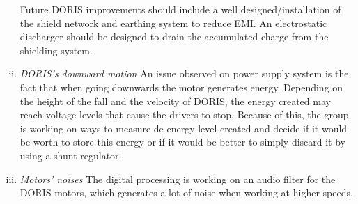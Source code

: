\documentclass{ifacconf}
\begin{document}
\begin{enumerate}[i)]
  \newline
  Future DORIS improvements should include a well designed/installation of the
  shield network and earthing system to reduce EMI. An electrostatic discharger
  should be designed to drain the accumulated charge from the shielding system.
  \item \emph{DORIS's downward motion}
  \newline
  An issue observed on power supply system is the fact that when going downwards
  the motor generates energy. Depending on the height of the fall and the velocity
  of DORIS, the energy created may reach voltage levels that cause the drivers
  to stop. Because of this, the group is working on ways to measure de energy
  level created and decide if it would be worth to store this energy or if it
  would be better to simply discard it by using a shunt regulator.
  \item \emph{Motors' noises}
  \newline
  The digital processing is working on an audio filter for the DORIS motors,
  which generates a lot of noise when working at higher speeds.
\end{enumerate}

             

\appendix
 
\end{document}
